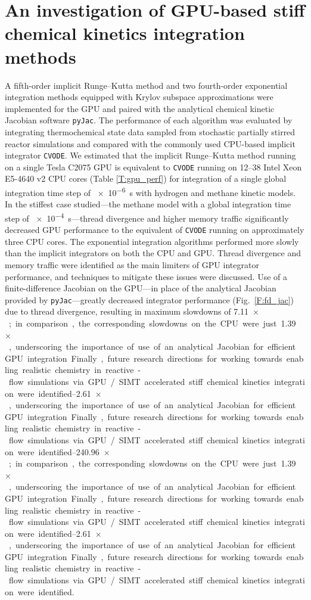 \documentclass[a4paper,10pt]{article}
\begin{document}
\section{An investigation of GPU-based stiff chemical kinetics integration methods}
A fifth-order implicit Runge--Kutta method and two fourth-order exponential integration methods equipped with Krylov subspace approximations were implemented for the GPU and paired with the analytical chemical kinetic Jacobian software \texttt{pyJac}.
The performance of each algorithm was evaluated by integrating thermochemical state data sampled from stochastic partially stirred reactor simulations and compared with the commonly used CPU-based implicit integrator \texttt{CVODE}.
We estimated that the implicit Runge--Kutta method running on a single Tesla C2075 GPU is equivalent to \texttt{CVODE} running on \numrange{12}{38} Intel Xeon E5-4640 v2 CPU cores (Table \ref{T:gpu_perf}) for integration of a single global integration time step of \SI{e-6}{\second} with hydrogen and methane kinetic models.
In the stiffest case studied---the methane model with a global integration time step of \SI{e-4}{\second}---thread divergence and higher memory traffic significantly decreased GPU performance to the equivalent of \texttt{CVODE} running on approximately three CPU cores.
The exponential integration algorithms performed more slowly than the implicit integrators on both the CPU and GPU.
Thread divergence and memory traffic were identified as the main limiters of GPU integrator performance, and techniques to mitigate these issues were discussed.
Use of a finite-difference Jacobian on the GPU---in place of the analytical Jacobian provided by \texttt{pyJac}---greatly decreased integrator performance (Fig.~\ref{F:fd_jac}) due to thread divergence, resulting in maximum slowdowns of \SIrange{7.11}{240.96}{$\times$}; in comparison, the corresponding slowdowns on the CPU were just \SIrange{1.39}{2.61}{$\times$}, underscoring the importance of use of an analytical Jacobian for efficient GPU integration.
Finally, future research directions for working towards enabling realistic chemistry in reactive-flow simulations via GPU\slash SIMT accelerated stiff chemical kinetics integration were identified.
\end{document}
